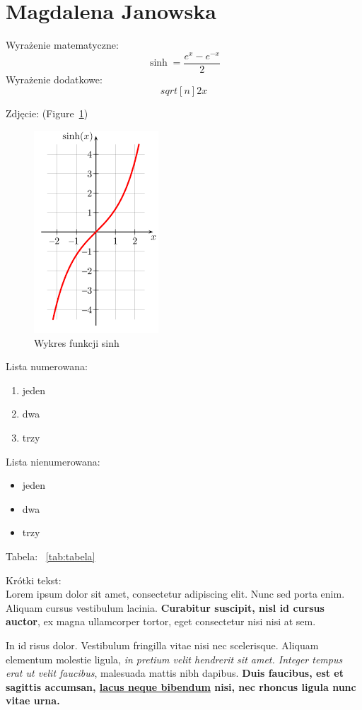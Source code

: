\section{Magdalena Janowska}
 Wyrażenie matematyczne:
\[\sinh=\frac{e^{x}-e^{-x}}{2}\]
 Wyrażenie dodatkowe:
\[sqrt[n]{2x}\]

 Zdjęcie: (Figure~\ref{fig:wykres})
\begin{figure} [htbp]
    \centering
    \includegraphics[scale=0.8]{pictures/wykres.png}
    \caption{Wykres funkcji sinh}
    \label{fig:wykres}
\end{figure}
 
 Lista numerowana:
\begin{enumerate}
    \item jeden
    \item dwa
    \item trzy
\end{enumerate}

 Lista nienumerowana:
\begin{itemize}
    \item jeden
    \item dwa
    \item trzy
\end{itemize}
 

 Tabela: ~\ref{tab:tabela}


 Krótki tekst:\\
 
Lorem ipsum dolor sit amet, consectetur adipiscing elit. Nunc sed porta enim. Aliquam cursus vestibulum lacinia. \textbf{Curabitur suscipit, nisl id cursus auctor}, ex magna ullamcorper tortor, eget consectetur nisi nisi at sem.

In id risus dolor. Vestibulum fringilla vitae nisi nec scelerisque. Aliquam elementum molestie ligula, \emph{ in pretium velit hendrerit sit amet. Integer tempus erat ut velit faucibus}, malesuada mattis nibh dapibus. \textbf{Duis faucibus, est et sagittis accumsan,  \underline{lacus neque bibendum} nisi, nec rhoncus ligula nunc vitae urna.} 

    
    
